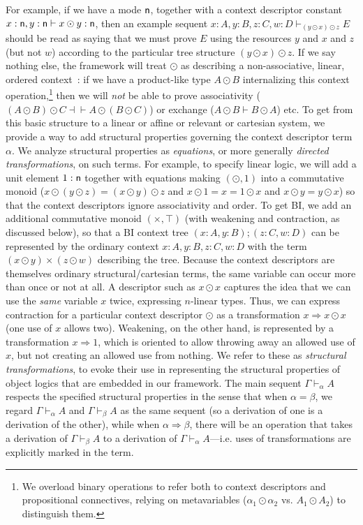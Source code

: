 \documentclass[a4paper,USenglish,numberwithinsect]{lipics-v2016}
\newcommand\spr{\ensuremath{\Rightarrow}} %
\newcommand\seq[3]{\ensuremath{#1 \vdash_{#2} #3}}
\begin{document}
For example, if we have a mode $\mathsf{n}$, together with a context
descriptor constant $x : \mathsf{n}, y:\mathsf{n} \vdash x \odot y : \mathsf{n}$,
then an example sequent \seq{x:A, y:B, z:C, w:D}{(y \odot x) \odot z}{E}
should be read as saying that we must prove $E$ using the resources $y$
and $x$ and $z$ (but not $w$) according to the particular tree structure
${(y \odot x) \odot z}$.  If we say nothing else, the framework will
treat $\odot$ as describing a non-associative, linear, ordered
context~\cite{lambek58calculus}: if we have a product-like type $A \odot B$ 
internalizing this context operation,\footnote{We overload
  binary operations to refer both to context descriptors and
  propositional connectives, relying on metavariables ($\alpha_1 \odot
  \alpha_2$ vs. $A_1 \odot A_2$) to distinguish them.}
then we will \emph{not} be able to prove associativity ($(A \odot B)
\odot C \dashv\vdash A \odot (B \odot C)$) or exchange ($A \odot B
\vdash B \odot A$) etc.  
To get from this basic structure to a linear or affine or relevant or
cartesian system, we provide a way to add structural properties governing
the context descriptor term $\alpha$.  We analyze structural properties
as \emph{equations}, or more generally \emph{directed transformations},
on such terms.  For example, to specify linear logic, we will add a unit
element $1 : \mathsf{n}$ together with equations making $(\odot,1)$ into a
commutative monoid ($x \odot (y \odot z) = (x \odot y) \odot z$ and 
$x \odot 1 = x = 1 \odot x$ and 
$x \odot y = y \odot x$)
so that the context descriptors ignore associativity and order.  To get
BI, we add an additional commutative monoid $(\times,\top)$ (with
weakening and contraction, as discussed below), so that a BI context
tree $(x:A,y:B);(z:C,w:D)$ can be represented by the ordinary context
$x:A,y:B,z:C,w:D$ with the term $(x \odot y) \times (z \odot w)$
describing the tree.  Because the context descriptors are themselves
ordinary structural/cartesian terms, the same variable can occur more
than once or not at all.  A descriptor such as $x \odot x$ captures the
idea that we can use the \emph{same} variable $x$ twice, expressing
$n$-linear types.  Thus, we can express contraction for a particular
context descriptor $\odot$ as a transformation $x \spr x \odot x$ (one
use of $x$ allows two).  Weakening, on the other hand, is represented by
a transformation $x \spr 1$, which is oriented to allow throwing away an
allowed use of $x$, but not creating an allowed use from nothing.  We
refer to these as \emph{structural transformations}, to evoke their use
in representing the structural properties of object logics that are
embedded in our framework.  The main sequent $\seq{\Gamma}{\alpha}{A}$
respects the specified structural properties in the sense that when
$\alpha = \beta$, we regard $\seq{\Gamma}{\alpha}{A}$ and
$\seq{\Gamma}{\beta}{A}$ as the same sequent (so a derivation of one is
a derivation of the other), while when $\alpha \spr
\beta$, there will be an operation that takes a derivation of
\seq{\Gamma}{\beta}{A} to a derivation of
\seq{\Gamma}{\alpha}{A}---i.e. uses of transformations are explicitly
marked in the term.  
\end{document}
